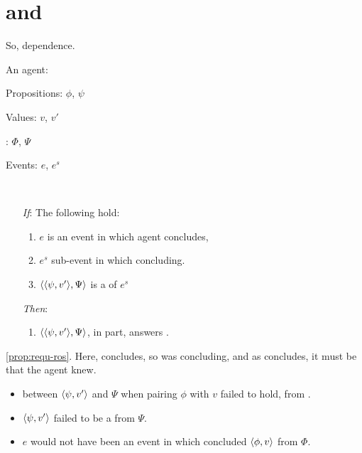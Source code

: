 \section{ and \qWhyV{}}

\begin{note}
  \questionWhyV*

  So, dependence.

  \begin{proposition}
    \label{prop:Requ-WhyV}
    \begin{itemize*}[noitemsep]
    \item
      An agent: \vAgent{}
    \item
      Propositions: \(\phi\), \(\psi\)
    \item
      Values: \(v\), \(v'\)
    \item
      : \(\Phi\), \(\Psi\)
    \item
      Events: \(e\), \(e^{s}\)
    \item
      \mbox{ }
    \end{itemize*}

    \begin{itemize}
    \item[\emph{If}:]
      The following hold:
      \begin{enumerate}[label=\alph*., ref=(\alph*), series=propRequWhyVSeries]
      \item
        \(e\) is an event in which agent concludes,
      \item
        \(e^{s}\) sub-event in which concluding.
      \item
        \(\langle \langle \psi, v' \rangle, \Psi \rangle\) is a \requ{} of \(e^{s}\)
      \end{enumerate}
    \item[\emph{Then}:]
      \begin{enumerate}[label=\alph*., ref=(\alph*), resume*=propRequWhyVSeries]
      \item
        \(\langle \langle \psi, v' \rangle, \Psi \rangle\), in part, answers \qWhyV{}.
      \end{enumerate}
    \end{itemize}
  \end{proposition}

  \autoref{prop:requ-ros}.
  Here, concludes, so was concluding, and as concludes, it must be that the agent knew.
\end{note}

\begin{note}
    \begin{itemize}
  \item
     between \(\langle \psi, v' \rangle\) and \(\Psi\) when pairing \(\phi\) with \(v\) failed to hold, from .
  \item
    \(\langle \psi, v' \rangle\) failed to be a \fc{} from \(\Psi\).
  \item
    \(e\) would not have been an event in which \vAgent{} concluded \(\langle \phi, v \rangle\) from \(\Phi\).
  \end{itemize}
\end{note}

